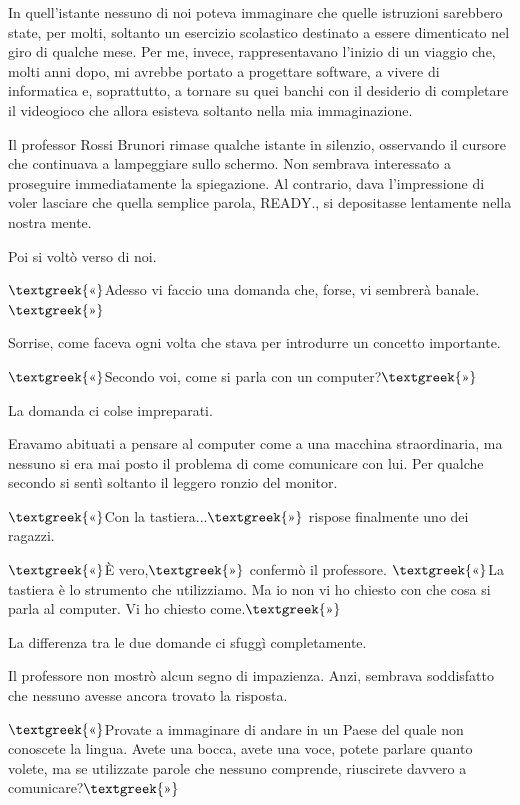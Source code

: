 \documentclass{article}
\begin{document}
In quell'istante nessuno di noi poteva immaginare che quelle istruzioni sarebbero state, per molti, soltanto un
esercizio scolastico destinato a essere dimenticato nel giro di qualche mese. Per me, invece, rappresentavano l'inizio
di un viaggio che, molti anni dopo, mi avrebbe portato a progettare software, a vivere di informatica e, soprattutto, a
tornare su quei banchi con il desiderio di completare il videogioco che allora esisteva soltanto nella mia
immaginazione.

Il professor Rossi Brunori rimase qualche istante in silenzio, osservando il cursore che continuava a lampeggiare sullo
schermo. Non sembrava interessato a proseguire immediatamente la spiegazione. Al contrario, dava l'impressione di voler
lasciare che quella semplice parola, READY., si depositasse lentamente nella nostra mente.

Poi si voltò verso di noi.

$\text{\textgreek{«}}$Adesso vi faccio una domanda che, forse, vi sembrerà banale.$\text{\textgreek{»}}$

Sorrise, come faceva ogni volta che stava per introdurre un concetto importante.

$\text{\textgreek{«}}$Secondo voi, come si parla con un computer?$\text{\textgreek{»}}$

La domanda ci colse impreparati.

Eravamo abituati a pensare al computer come a una macchina straordinaria, ma nessuno si era mai posto il problema di
come comunicare con lui. Per qualche secondo si sentì soltanto il leggero ronzio del monitor.

$\text{\textgreek{«}}$Con la tastiera...$\text{\textgreek{»}}$ rispose finalmente uno dei ragazzi.

$\text{\textgreek{«}}$È vero,$\text{\textgreek{»}}$ confermò il professore. $\text{\textgreek{«}}$La tastiera è lo
strumento che utilizziamo. Ma io non vi ho chiesto con che cosa si parla al computer. Vi ho chiesto
come.$\text{\textgreek{»}}$

La differenza tra le due domande ci sfuggì completamente.

Il professore non mostrò alcun segno di impazienza. Anzi, sembrava soddisfatto che nessuno avesse ancora trovato la
risposta.

$\text{\textgreek{«}}$Provate a immaginare di andare in un Paese del quale non conoscete la lingua. Avete una bocca,
avete una voce, potete parlare quanto volete, ma se utilizzate parole che nessuno comprende, riuscirete davvero a
comunicare?$\text{\textgreek{»}}$
\end{document}
